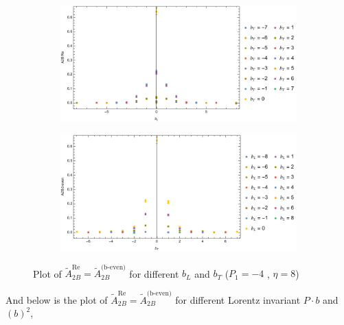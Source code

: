 \documentclass[]{article}
\numberwithin{equation}{section}
\newcommand{\tAmp}{\widetilde{A}}
\newcommand{\tAmp}{\ensuremath{\widetilde{A}^{(+)}}}
\begin{document}
\begin{figure}[h!]
     \centering
     \begin{subfigure}[b]{0.45\textwidth}
         \centering
         \includegraphics[width=\textwidth]{Amp_plots/bL_A2B_b_even_P1_-4_eta_8.pdf}
     \end{subfigure}
     \begin{subfigure}[b]{0.45\textwidth}
         \centering
         \includegraphics[width=\textwidth]{Amp_plots/bT_A2B_b_even_P1_-4_eta_8.pdf}
     \end{subfigure}
        \caption{Plot of  $\tAmp^{\text{Re}}_{2B}=\tAmp^{\text{(b-even)}}_{2B}$ for different $b_{L}$ and $b_{T}$  ($P_{1} = -4$ , $\eta=8$)}
\end{figure}
\pagebreak
And below is the plot of $\tAmp^{\text{Re}}_{2B}=\tAmp^{\text{(b-even)}}_{2B}$ for different Lorentz invariant $P\cdot b$ and $(b)^2$,
\end{document}
